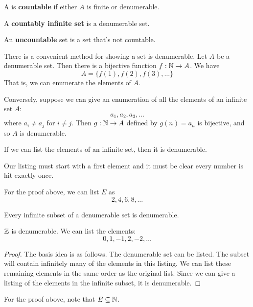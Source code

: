 \documentclass{article}
\begin{document}
    \begin{definition}
      A is \textbf{countable} if either $A$ is finite or denumerable.
    \end{definition}
    \begin{definition}
      A \textbf{countably infinite set} is a denumerable set.
    \end{definition}
    \begin{definition}
      An \textbf{uncountable} set is a set that's not countable.
    \end{definition}
    \begin{proposition}
      There is a convenient method for showing a set is denumerable. Let $A$ be a denumerable set. Then there is a bijective function $f: \mathbb{N} \to A$. We have \[
        A = \{f(1), f(2), f(3), \ldots\}
      \]
      That is, we can enumerate the elements of $A$.

      Conversely, suppose we can give an enumeration of all the elements of an infinite set $A$:
      \[
        a_1, a_2, a_3, \ldots
      \]
      where $a_i \neq a_j$ for $i \neq j$. Then $g: \mathbb{N} \to A$ defined by $g(n) = a_n$ is bijective, and so $A$ is denumerable.

      If we can list the elements of an infinite set, then it is denumerable.

      Our listing must start with a first element and it must be clear every number is hit exactly once.
    \end{proposition}
    \begin{example}
      For the proof above, we can list $E$ as
      \[
        2, 4, 6, 8, \ldots
      \]
    \end{example}
    \begin{theorem}
      Every infinite subset of a denumerable set is denumerable.
    \end{theorem}
    \begin{example}
      $\mathbb{Z}$ is denumerable. We can list the elements:
      \[
        0, 1, -1, 2, -2, \ldots
      \]
    \end{example}
    \begin{proof}
      The basis idea is as follows. The denumerable set can be listed. The subset will contain infinitely many of the elements in this listing. We can list these remaining elements in the same order as the original list. Since we can give a listing of the elements in the infinite subset, it is denumerable.
    \end{proof}
    \begin{example}
      For the proof above, note that $E \subseteq \mathbb{N}$.
    \end{example}
\end{document}

